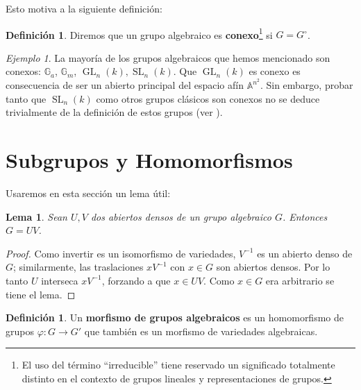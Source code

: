 \documentclass[spanish,10pt]{amsart}
\newtheorem{lemma}[theorem]{Lema}
\theoremstyle{definition}
\newtheorem{definition}[theorem]{Definición}
\theoremstyle{remark}
\newtheorem{example}[theorem]{Ejemplo}
\numberwithin{equation}{section}
\newcommand{\afine}[1]{\mathbb{A}^{#1}}
\begin{document}
Esto motiva a la siguiente definición:
\begin{definition}
Diremos que un grupo algebraico es \textbf{conexo}\footnote{El uso del término ``irreducible'' tiene reservado un significado totalmente distinto en el contexto de grupos lineales y representaciones de grupos.} si $G = G^\circ$.
\end{definition}

\begin{example}
La mayoría de los grupos algebraicos que hemos mencionado son conexos: $\mathbb G_a$, $\mathbb{G}_m$, $\operatorname{GL}_n (k), \operatorname{SL}_n (k)$. Que $\operatorname{GL}_n (k)$ es conexo es consecuencia de ser un abierto principal del espacio afín $\afine {n^2}$. Sin embargo, probar tanto que $\operatorname{SL}_n (k)$ como otros grupos clásicos son conexos no se deduce trivialmente de la definición de estos grupos (ver \cite[(7.5)]{humphreys2012linearAlgebraicGroups}).
\end{example}

\section{Subgrupos y Homomorfismos}

Usaremos en esta sección un lema útil:
\begin{lemma}
Sean $U,V$ dos abiertos densos de un grupo algebraico $G$. Entonces $G = U V$.
\end{lemma}
\begin{proof}
Como invertir es un isomorfismo de variedades, $V^{-1}$ es un abierto denso de $G$; similarmente, las traslaciones $x V^{-1}$ con $x \in G$ son abiertos densos. Por lo tanto $U$ interseca $x V^{-1}$, forzando a que $x \in U V$. Como $x \in G$ era arbitrario se tiene el lema.
\end{proof}

\begin{definition}
Un \textbf{morfismo de grupos algebraicos} es un homomorfismo de grupos $\varphi : G \to G'$ que también es un morfismo de variedades algebraicas.
\end{definition}
\end{document}

